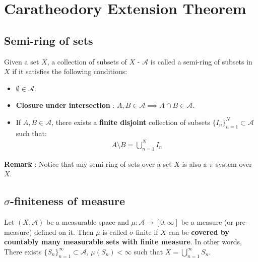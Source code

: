 \section{Caratheodory Extension Theorem}
\subsection{Semi-ring of sets}
\begin{definition}
    Given a set $X$, a collection of subsets of $X$ - $\mathcal{A}$ is called a semi-ring of subsets in $X$ if it satisfies the following conditions:
    \begin{itemize}
        \item $\emptyset \in \mathcal{A}$.
        \item \textbf{Closure under intersection} : $A, B \in \mathcal{A} \implies A \cap B \in \mathcal{A}$.
        \item If $A, B \in \mathcal{A}$, there exists a \textbf{finite disjoint} collection of subsets $\{I_n\}_{n=1}^N\subset \mathcal{A}$ such that:
        \begin{align*}
            A \setminus B = \bigcup_{n=1}^N I_n
        \end{align*}
    \end{itemize}
\end{definition}

\noindent \textbf{Remark} : Notice that any semi-ring of sets over a set $X$ is also a $\pi$-system over $X$.

\subsection{$\sigma$-finiteness of measure}
\begin{definition}
    Let $(X, \mathcal{A})$ be a measurable space and $\mu:\mathcal{A} \to [0, \infty]$ be a measure (or pre-measure) defined on it. Then $\mu$ is called $\sigma$-finite if $X$ can be \textbf{covered by countably many measurable sets with finite measure}. In other words,
    There exists $\{S_n\}_{n=1}^\infty \subset \mathcal{A}$, $\mu(S_n) < \infty$ such that $X = \bigcup_{n=1}^\infty S_n$.
\end{definition}

